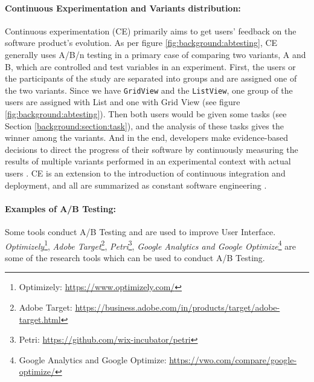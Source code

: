 \paragraph{Continuous Experimentation and Variants distribution:} 
Continuous experimentation (CE) primarily aims to get users' feedback on the software product's evolution.
As per figure \ref{fig:background:abtesting}, CE generally uses A/B/n testing in a primary case of comparing two variants, A and B, which are controlled and test variables in an experiment.
First, the users or the participants of the study are separated into groups and are assigned one of the two variants.
Since we have \texttt{GridView} and the \texttt{ListView}, one group of the users are assigned with List and one with Grid View (see figure \ref{fig:background:abtesting}).
Then both users would be given some tasks (see Section \ref{background:section:task}), and the analysis of these tasks gives the winner among the variants.  
And in the end, developers make evidence-based decisions to direct the progress of their software by continuously measuring the results of multiple variants performed in an experimental context with actual users \cite{article:CE:ros}.
CE is an extension to the introduction of continuous integration and deployment, and all are summarized as constant software engineering \cite{article:CE:fitzgerald}.

\paragraph{Examples of A/B Testing:}
Some tools conduct A/B Testing and are used to improve User Interface. \textit{Optimizely}\footnote{Optimizely: \url{https://www.optimizely.com/}}, \textit{Adobe Target}\footnote{Adobe Target: \url{https://business.adobe.com/in/products/target/adobe-target.html}}, \textit{Petri}\footnote{Petri: \url{https://github.com/wix-incubator/petri}}, \textit{Google Analytics and Google Optimize}\footnote{Google Analytics and Google Optimize: \url{https://vwo.com/compare/google-optimize/}} are some of the research tools which can be used to conduct A/B Testing.

\clearpage




